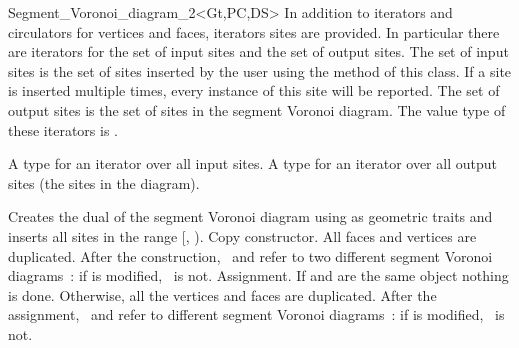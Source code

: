 \begin{ccRefClass}{Segment_Voronoi_diagram_2<Gt,PC,DS>}
In addition to iterators and circulators for vertices and faces,
iterators sites are provided. In particular there are iterators
for the set of input sites and the set of output sites. The set of
input sites is the set of sites inserted by the user using the
 method of this class. If a site is inserted multiple
times, every instance of this site will be reported. The set of output
sites is the set of sites in the segment Voronoi diagram. The value
type of these iterators is .

{}
{A type for an iterator over all input sites.}
\ccGlue
{}
{A type for an iterator over all output sites (the sites in the
  diagram).}


\ccCreation
{}
\ccThreeToTwo
%
%
{Creates the dual of the segment Voronoi diagram using  as
geometric traits and inserts all sites in the range
[, ).
}
%
{Copy constructor. All faces and vertices are duplicated. After the
  construction, 
  \ccVar\ and  refer to two different segment Voronoi diagrams~: if
   is modified, \ccVar\ is not.}
%
{Assignment. If  and  are the same object
  nothing is done. Otherwise, all the vertices and faces are
  duplicated. After the assignment, \ccVar\ and  refer to
  different segment Voronoi diagrams~: if  is modified,
  \ccVar\ is not.}





\end{ccRefClass}
